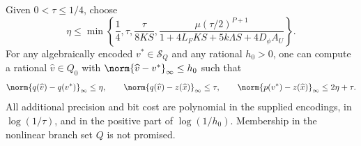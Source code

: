 \begin{lemma}
\label{lem:accuracy-recovery}
Given $0<\tau\le1/4$, choose
\begin{equation}\label{eq:accuracy-general-tolerance}
 \eta\le\min\left\{\frac14,\tau,\frac{\tau}{8KS},
 \frac{\mu(\tau/2)^{P+1}}
              {1+4L_FKS+5k\Lambda S+4D_\phi A_U}\right\}.
\end{equation}
For any algebraically encoded $v^*\in\mathcal S_Q$ and any rational
$h_0>0$, one can compute a rational $\widehat v\in Q_0$ with
$\norm{\widehat v-v^*}_\infty\le h_0$ such that
\begin{equation}\label{eq:accuracy-recovery-interface}
 \norm{q(\widehat v)-q(v^*)}_\infty\le\eta,\qquad
 \norm{q(\widehat v)-z(\widehat x)}_\infty\le\tau,\qquad
 \norm{p(v^*)-z(\widehat x)}_\infty\le2\eta+\tau.
\end{equation}
All additional precision and bit cost are polynomial in the supplied
encodings, in $\log(1/\tau)$, and in the positive part of
$\log(1/h_0)$.
Membership in the nonlinear branch set $Q$ is not promised.
\end{lemma}
